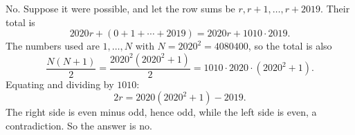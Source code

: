 No. Suppose it were possible, and let the row sums be $r,r+1,\dots,r+2019$. Their total is
\[2020r+(0+1+\cdots+2019)=2020r+1010\cdot2019.\]
The numbers used are $1,\dots,N$ with $N=2020^2=4080400$, so the total is also
\[\dfrac{N(N+1)}{2}=\dfrac{2020^2\left(2020^2+1\right)}{2}=1010\cdot2020\cdot\left(2020^2+1\right).\]
Equating and dividing by $1010$:
\[2r=2020\left(2020^2+1\right)-2019.\]
The right side is even minus odd, hence odd, while the left side is even, a contradiction. So the answer is $\boxed{\text{no}}$.
